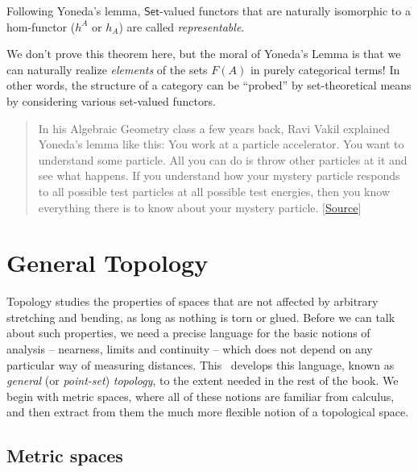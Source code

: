 \begin{defn}
    Following Yoneda's lemma, $\mathsf{Set}$-valued functors that are naturally isomorphic to a hom-functor ($h^A$ or $h_A$) are called \emph{representable}.
\end{defn}
\begin{rem}
    We don't prove this theorem here, but the moral of Yoneda's Lemma
    is that we can naturally realize \emph{elements} of the sets
    $F(A)$ in purely categorical terms! In other words, the structure of a category can be ``probed'' by set-theoretical means by considering various set-valued functors.

    \begin{quote}
        \small In his Algebraic Geometry class a few years back, Ravi Vakil
        explained Yoneda's lemma like this: You work at a particle accelerator.
        You want to understand some particle. All you can do is throw other
        particles at it and see what happens. If you understand how your mystery
        particle responds to all possible test particles at all possible test
        energies, then you know everything there is to know about your mystery
        particle. {[}\href{https://mathoverflow.net/a/3223/22773}{Source}{]}
    \end{quote}
\end{rem}






\clearpage
\chapter{General Topology}\label{ch: general topology}

Topology studies the properties of spaces that are not affected by arbitrary stretching and bending, as long as nothing is torn or glued. Before we can talk about such properties, we need a precise language for the basic notions of analysis -- nearness, limits and continuity -- which does not depend on any particular way of measuring distances. This \chap\ develops this language, known as \emph{general} (or \emph{point-set}) \emph{topology}, to the extent needed in the rest of the book. We begin with metric spaces, where all of these notions are familiar from calculus, and then extract from them the much more flexible notion of a topological space.


\section{Metric spaces}\label{sec: metric spaces}


